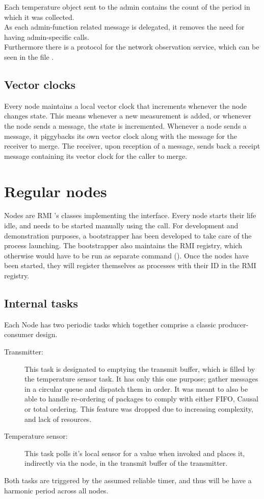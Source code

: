 \documentclass[10pt,a4paper]{article}
\begin{document}
Each temperature object sent to the admin contains the count of the period in which it was collected.\\
As each admin-function related message is delegated, it removes the need for having admin-specific calls.\\
Furthermore there is a protocol for the network observation service, which can be seen in the file .


\subsection{Vector clocks}
Every node maintains a local vector clock that increments whenever the node changes state. This means whenever a new measurement is added, or whenever the node sends a message, the state is incremented. Whenever a node sends a message, it piggybacks its own vector clock along with the message for the receiver to merge. The receiver, upon reception of a message, sends back a receipt message containing its vector clock for the caller to merge.\\

\section{Regular nodes}
Nodes are RMI 's classes implementing the  interface.
Every node starts their life idle, and needs to be started manually using the  call. For development and demonstration purposes, a bootstrapper has been developed to take care of the process launching. The bootstrapper also maintains the RMI registry, which otherwise would have to be run as separate command ().
Once the nodes have been started, they will register themselves as processes with their ID in the RMI registry.

\subsection{Internal tasks}
\label{sec:internal_tasks}
Each Node has two periodic tasks which together comprise a classic producer-consumer design.
\begin{description}
  \item[Transmitter:] This task is designated to emptying the transmit buffer, which is filled by the temperature sensor task. It has only this one purpose; gather messages in a circular queue and dispatch them in order. It was meant to also be able to handle re-ordering of packages to comply with either FIFO, Causal or total ordering. This feature was dropped due to increasing complexity, and lack of resources.
  \item[Temperature sensor:] This task polls it's local sensor for a value when invoked and places it, indirectly via the node, in the transmit buffer of the transmitter.
\end{description}
Both tasks are triggered by the assumed reliable timer, and thus will be have a harmonic period across all nodes.
\end{document}
